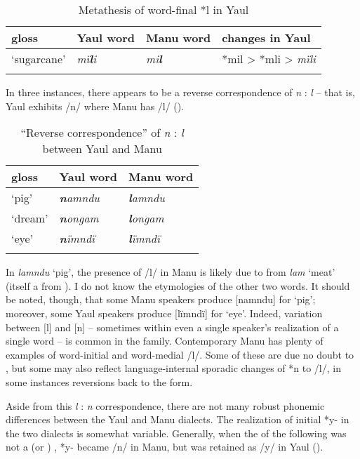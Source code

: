 \begin{table}
\caption{Metathesis of word-final *l in Yaul}
\label{tab:18.7}
\begin{tabular}{llll}

\lsptoprule

gloss & Yaul word & Manu word & changes in Yaul\\
\midrule
‘sugarcane’ & {\itshape mï\textbf{l}i} & {\itshape mi\textbf{l}} & *mil > *mli > \textit{mïli}\\
\lspbottomrule
\end{tabular}
\end{table}
In three instances, there appears to be a reverse correspondence of \textit{n} : \textit{l} – that is, Yaul exhibits /n/ where Manu has /l/ ().


\begin{table}
\caption{“Reverse correspondence” of \textit{n} : \textit{l} between Yaul and Manu}
\label{tab:18.8}


\begin{tabular}{lll}

\lsptoprule

gloss & Yaul word & Manu word\\
\midrule
‘pig’ & {\itshape \textbf{n}amndu} & {\itshape \textbf{l}amndu}\\
‘dream’ & {\itshape \textbf{n}ongam} & {\itshape \textbf{l}ongam}\\
‘eye’ & {\itshape \textbf{n}ïmndï} & {\itshape \textbf{l}ïmndï}\\
\lspbottomrule
\end{tabular}
\end{table}
In \textit{lamndu} ‘pig’, the presence of /l/ in Manu is likely due to  from \textit{lam} ‘meat’ (itself a  from ). I do not know the etymologies of the other two words. It should be noted, though, that some Manu speakers produce [namndu] for ‘pig’; moreover, some Yaul speakers produce [lïmndï] for ‘eye’. Indeed, variation between [l] and [n] -- sometimes within even a single speaker’s realization of a single word -- is common in the  family. Contemporary Manu has plenty of examples of word-initial and word-medial /l/. Some of these are due no doubt to , but some may also reflect language-internal sporadic changes of *n to /l/, in some instances reversions back to the  form.

  Aside from this \textit{l} : \textit{n} correspondence, there are not many robust phonemic differences between the Yaul and Manu dialects. The realization of initial *y- in the two dialects is somewhat variable. Generally, when the  of the following  was not a  (or ) , *y- became /n/ in Manu, but was retained as /y/ in Yaul ().


